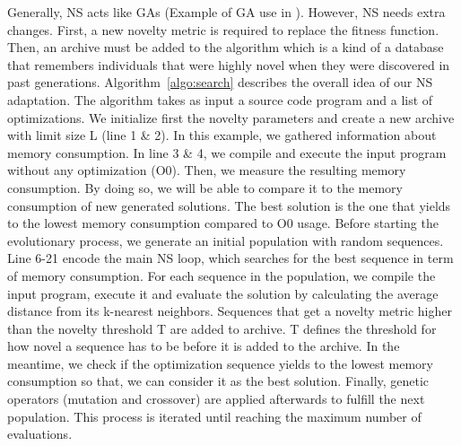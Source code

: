 Generally, NS acts like GAs (Example of GA use in  \cite{cooper2002adaptive}). However, NS needs extra changes. First, a new novelty metric is required to replace the fitness function. Then, an archive must be added to the algorithm which is a kind of a database that remembers individuals that were highly novel when they were discovered in past generations. 
Algorithm~\ref{algo:search} describes the overall idea of our NS adaptation. The algorithm takes as input a source code program and a list of optimizations. We initialize first the novelty parameters and create a new archive with limit size L (line 1 \& 2). In this example, we gathered information about memory consumption. In line 3 \& 4, we compile and execute the input program without any optimization (O0). Then, we measure the resulting memory consumption. By doing so, we will be able to compare it to the memory consumption of new generated solutions. The best solution is the one that yields to the lowest memory consumption compared to O0 usage.
Before starting the evolutionary process, we generate an initial population with random sequences. Line 6-21 encode the main NS loop, which searches for the best sequence in term of memory consumption. For each sequence in the population, we compile the input program, execute it and evaluate the solution by calculating the average distance from its k-nearest neighbors. Sequences that get a novelty metric higher than the novelty threshold T are added to archive. T defines the threshold for how novel a sequence has to be before it is added to the archive. In the meantime, we check if the optimization sequence yields to the lowest memory consumption so that, we can consider it as the best solution. Finally, genetic operators
(mutation and crossover) are applied afterwards to fulfill the next population. This process is iterated until reaching the maximum number of evaluations.



